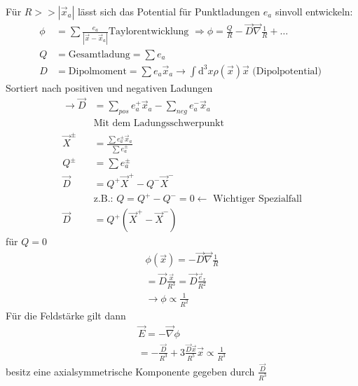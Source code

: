 \documentclass[a4paper]{article}
\begin{document}
Für $R>>|\vec{x}_a|$ lässt sich das Potential für Punktladungen $e_a$ sinvoll
entwickeln:
\begin{align}
\phi&=\sum\frac{e_a}{|\vec{x}-\vec{x}_a|}
\text{Taylorentwicklung } \Rightarrow \phi=\frac{Q}{R}-
\vec{D}\vec{\nabla}\frac{1}{R}+\ldots\\
Q&=\text{Gesamtladung}=\sum e_a\\
D&=\text{Dipolmoment}=\sum e_a \vec{x}_a \rightarrow \int
\mathrm{d}^3x\rho(\vec{x})\vec{x} \text{  (Dipolpotential)  }
\end{align}
Sortiert nach positiven und negativen Ladungen
\begin{align}
\rightarrow \vec{D}&=\sum_{pos} e_a^+\vec{x}_a-\sum_{neg} e_a^-\vec{x}_a\\
&\text{Mit dem Ladungsschwerpunkt}\\
\vec{X}^\pm&=\frac{\sum e^\pm_a\vec{x}_a}{\sum e^\pm_a}\\
Q^\pm&=\sum e^\pm_a\\
\vec{D}&=Q^+\vec{X}^+-Q^-\vec{X}^-\\
&\text{z.B.: }Q=Q^+-Q^-=0 \leftarrow \text{ Wichtiger Spezialfall}\\
\vec{D}&=Q^+(\vec{X}^+-\vec{X}^-)
\end{align} 
für $Q=0$
\begin{align}
\phi(\vec{x})=-\vec{D}\vec{\nabla}\frac{1}{R}\\
=\vec{D}\frac{\vec{x}}{R^3}=\vec{D}\frac{\vec{e}_x}{R^2}\\
\rightarrow \phi \propto \frac{1}{R^2}
\end{align}
Für die Feldstärke gilt dann
\begin{align}
\vec{E}=-\vec{\nabla}\phi\\
=-\frac{\vec{D}}{R^3}+3\frac{\vec{D}\vec{x}}{R^5}\vec{x}\propto \frac{1}{R^3}
\end{align}
besitz eine axialsymmetrische Komponente gegeben durch $\frac{\vec{D}}{R^3}$
\end{document}
